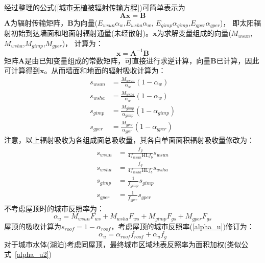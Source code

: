 经过整理的公式(\ref{城市无植被辐射传输方程})可简单表示为
\begin{equation}\label{mathbf_AX}
\mathbf{A x}=\mathbf{B}
\end{equation}
$\mathbf{A}$为辐射传输矩阵，$\mathbf{B}$为向量($E_{wsun}\alpha_w$,$E_{wsha}\alpha_w$,
$E_{gimp}\alpha_{gimp}$,$E_{gper}\alpha_{gper}$)，
即太阳辐射初始到达墙面和地面射辐射通量(未经散射)。$\mathbf{x}$为求解变量组成的向量(\allowbreak$M_{wsun}$,\allowbreak$M_{wsha}$,\allowbreak$M_{gimp}$,\allowbreak$M_{gper}$)，
计算为：
\begin{equation}\label{mathbf_X}
\mathbf{x}=\mathbf{A}^{-1} \mathbf{B}
\end{equation}
矩阵$\mathbf{A}$是由已知变量组成的常数矩阵，可直接进行求逆计算，向量$\mathbf{B}$已计算，因此可计算得到$\mathbf{x}$。从而墙面和地面的辐射吸收计算为：
\begin{equation}\label{s_wsun_wsha_gimp_gper_1}
\begin{aligned}s_{wsun} &=\frac{M_{wsun}}{\alpha_{w}}\left(1-\alpha_{w}\right) \\ 
    s_{wsha} &=\frac{M_{wsha}}{\alpha_{w}}\left(1-\alpha_{w}\right) \\
    s_{gimp} &=\frac{M_{gimp}}{\alpha_{gimp}}\left(1-\alpha_{gimp}\right) \\
    s_{gper} &=\frac{M_{gper}}{\alpha_{gper}}\left(1-\alpha_{gper}\right)\end{aligned}
\end{equation}
注意，以上辐射吸收为各组成面总吸收量，其各自单面面积辐射吸收量修改为：
\begin{equation}\label{s_wsun_wsha_gimp_gper_2}
\begin{aligned}s_{wsun} &=\frac{f_{g}}{4 f_{wsun} \mathrm{HL} f_{b}} s_{wsun} \\ 
    s_{wsha} &=\frac{f_{g}}{4 f_{wsha} \mathrm{HL} f_{b}} s_{wsha} \\ 
    s_{gimp} &=\frac{1}{f_{gimp}} s_{gimp} \\ 
    s_{gper} &=\frac{1}{f_{gper}} s_{gper}\end{aligned}
\end{equation}
不考虑屋顶时的城市反照率为：
\begin{equation}\label{alpha_u}
\alpha_{u}=M_{wsun} F_{ws}+M_{wsha} F_{ws}+M_{gimp} F_{gs}+M_{gper} F_{gs}
\end{equation}
屋顶的吸收计算为$s_{roof}=1-\alpha_{roof}$，考虑屋顶的城市反照率(\ref{alpha_u})修订为：
\begin{equation}\label{alpha_u2}
\alpha_{u}=\alpha_{{roof }} f_{roof}+\alpha_{u} f_{g}
\end{equation}
对于城市水体(湖泊)考虑同屋顶，最终城市区域地表反照率为面积加权(类似公式~\ref{alpha_u2})

